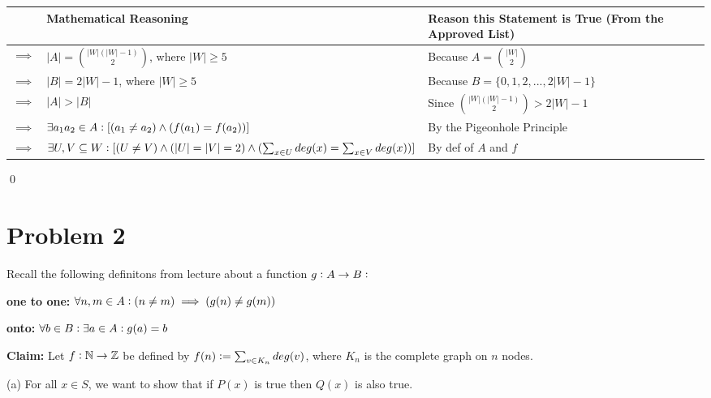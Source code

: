 \documentclass{article}
\begin{document}
\begin{flushleft}
	\begin{tabular}{|p{0.5cm}|p{6.6cm}|p{5.5cm}|}
		\hline
		 & \textbf{Mathematical Reasoning} & \textbf{Reason this Statement is True (From the Approved List)} \\
		\hline
		$\implies$ & $|A|= \binom{|W|(|W|-1)}{2}$, where $|W|\geq 5$ & Because $A=\binom{|W|}{2}$ \\
		\hline
		$\implies$ & $|B|= 2|W|-1$, where $|W|\geq 5$& Because $B=\{0,1,2,...,2|W|-1\}$ \\
		\hline
		$\implies$ & $|A|>|B|$ & Since $\binom{|W|(|W|-1)}{2}> 2|W|-1$ \\
		\hline
		$\implies$ & $\exists a_1a_2\in A\vcentcolon [(a_1\neq a_2)\land (f(a_1)=f(a_2))]$ & By the Pigeonhole Principle \\
		\hline
		$\implies$ & $\exists U,V\subseteq W\vcentcolon [(U\neq V)\land (|U|=|V|=2)\land (\sum_{x\in U} deg(x)=\sum_{x\in V} deg(x))]$ & By def of $A$ and $f$ \\
		\hline
	\end{tabular}
\end{flushleft}\vspace{15pt}

\qed



\pagebreak

\section{Problem 2}

\noindent Recall the following definitons from lecture about a function $g\vcentcolon A\rightarrow B\vcentcolon$\vspace{10pt}

\vspace{10pt}
\noindent\textbf{one to one:} $\forall n,m\in A\vcentcolon (n\neq m)\implies (g(n)\neq g(m))$

\vspace{10pt}
\noindent\textbf{onto:} $\forall b\in B\vcentcolon \exists a\in A\vcentcolon g(a)=b$
\vspace{10pt}


\noindent\textbf{Claim:} Let $f\vcentcolon\mathbb{N}\rightarrow\mathbb{Z}$ be defined by $f(n)\vcentcolon = \sum_{v\in K_n} deg(v)$, where $K_n$ is the complete graph on $n$ nodes.
\vspace{10pt}

(a) For all $x\in S$, we want to show that if $P(x)$ is true then $Q(x)$ is also true.\vspace{10pt}
\end{document}
